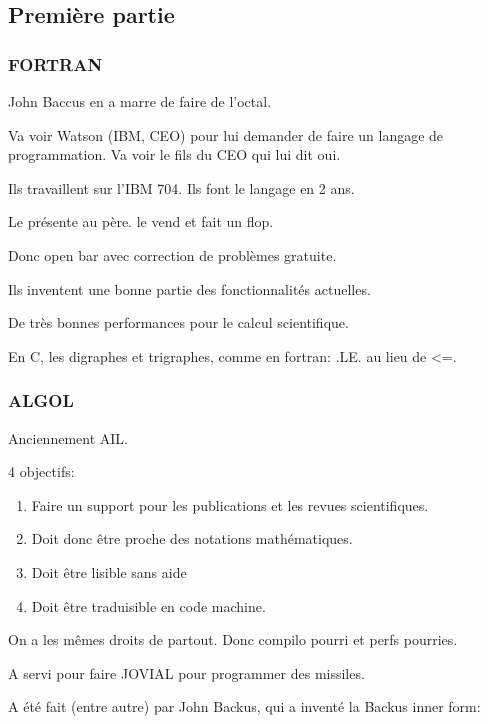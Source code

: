 \documentclass[a4paper,11pt]{article}
\begin{document}
\subsection{Première partie}

\subsubsection{FORTRAN}

John Baccus en a marre de faire de l'octal.

Va voir Watson (IBM, CEO) pour lui demander de faire un langage de
programmation. Va voir le fils du CEO qui lui dit oui.

Ils travaillent sur l'IBM 704. Ils font le langage en 2 ans.

Le présente au père. le vend et fait un flop.

Donc open bar avec correction de problèmes gratuite.

Ils inventent une bonne partie des fonctionnalités actuelles.

De très bonnes performances pour le calcul scientifique.

En C, les digraphes et trigraphes, comme en fortran: .LE. au lieu de <=.

\subsubsection{ALGOL}

Anciennement AIL.

4 objectifs:

\begin{enumerate}

\item Faire un support pour les publications et les revues scientifiques.

\item Doit donc être proche des notations mathématiques.

\item Doit être lisible sans aide

\item Doit être traduisible en code machine.

\end{enumerate}

On a les mêmes droits de partout. Donc compilo pourri et perfs pourries.

A servi pour faire JOVIAL pour programmer des missiles.

A été fait (entre autre) par John Backus, qui a inventé la Backus inner form:
\end{document}
